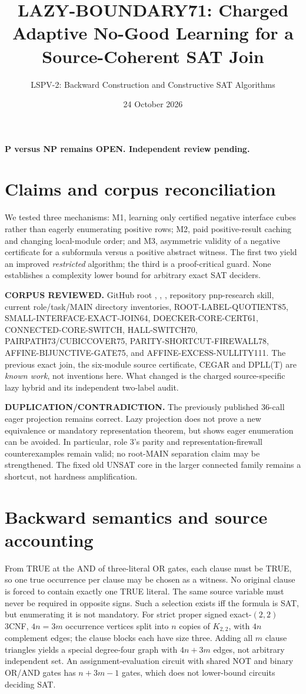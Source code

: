 \documentclass[11pt]{article}
\title{LAZY-BOUNDARY71: Charged Adaptive No-Good Learning for a Source-Coherent SAT Join}
\author{LSPV-2: Backward Construction and Constructive SAT Algorithms}
\date{24 October 2026}
\begin{document}
\maketitle
\begin{center}\textbf{P versus NP remains OPEN. Independent review pending.}\end{center}

\section{Claims and corpus reconciliation}
We tested three mechanisms: M1, learning only certified negative interface cubes rather than eagerly enumerating positive rows; M2, paid positive-result caching and changing local-module order; and M3, asymmetric validity of a negative certificate for a subformula versus a positive abstract witness. The first two yield an improved \emph{restricted} algorithm; the third is a proof-critical guard. None establishes a complexity lower bound for arbitrary exact SAT deciders.

\noindent\textbf{CORPUS REVIEWED.} GitHub root , , , repository pnp-research skill, current role/task/MAIN directory inventories, ROOT-LABEL-QUOTIENT85, SMALL-INTERFACE-EXACT-JOIN64, DOECKER-CORE-CERT61, CONNECTED-CORE-SWITCH, HALL-SWITCH70, PAIRPATH73/CUBICCOVER75, PARITY-SHORTCUT-FIREWALL78, AFFINE-BIJUNCTIVE-GATE75, and AFFINE-EXCESS-NULLITY111. The previous exact join, the six-module source certificate, CEGAR and DPLL(T) are \emph{known work}, not inventions here. What changed is the charged source-specific lazy hybrid and its independent two-label audit.

\noindent\textbf{DUPLICATION/CONTRADICTION.} The previously published 36-call eager projection remains correct. Lazy projection does not prove a new equivalence or mandatory representation theorem, but shows eager enumeration can be avoided. In particular, role 3's parity and representation-firewall counterexamples remain valid; no root-MAIN separation claim may be strengthened. The fixed old UNSAT core in the larger connected family remains a shortcut, not hardness amplification.

\section{Backward semantics and source accounting}
From TRUE at the AND of three-literal OR gates, each clause must be TRUE, so one true occurrence per clause may be chosen as a witness. No original clause is forced to contain exactly one TRUE literal. The same source variable must never be required in opposite signs. Such a selection exists iff the formula is SAT, but enumerating it is not mandatory. For strict proper signed exact-$(2,2)$ 3CNF, $4n=3m$ occurrence vertices split into $n$ copies of $K_{2,2}$, with $4n$ complement edges; the clause blocks each have size three. Adding all $m$ clause triangles yields a special degree-four graph with $4n+3m$ edges, not arbitrary independent set. An assignment-evaluation circuit with shared NOT and binary OR/AND gates has $n+3m-1$ gates, which does not lower-bound circuits deciding SAT.
\end{document}
